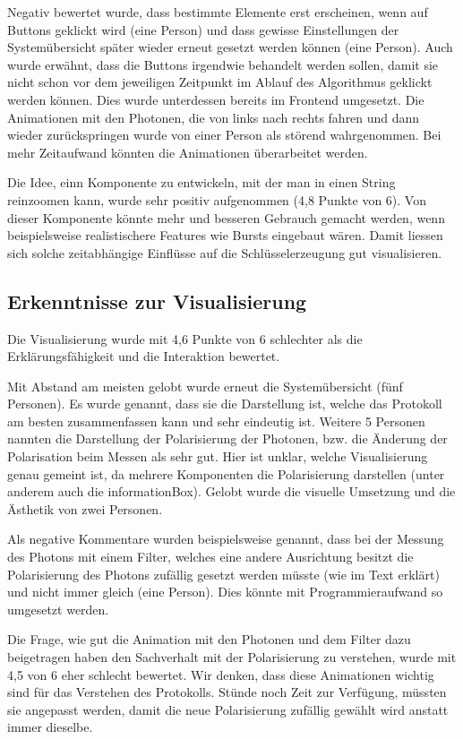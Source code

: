 \documentclass[a4paper,10.2pt,pdftex]{scrartcl}%
\begin{document}
Negativ bewertet wurde, dass bestimmte Elemente erst erscheinen, wenn auf Buttons geklickt wird (eine Person) und dass gewisse Einstellungen der Systemübersicht später wieder erneut gesetzt werden können (eine Person). Auch wurde erwähnt, dass die Buttons irgendwie behandelt werden sollen, damit sie nicht schon vor dem jeweiligen Zeitpunkt im Ablauf des Algorithmus geklickt werden können. Dies wurde unterdessen bereits im Frontend umgesetzt. Die Animationen mit den Photonen, die von links nach rechts fahren und dann wieder zurückspringen wurde von einer Person als störend wahrgenommen. Bei mehr Zeitaufwand könnten die Animationen überarbeitet werden.

Die Idee, einn Komponente zu entwickeln, mit der man in einen String reinzoomen kann, wurde sehr positiv aufgenommen (4,8 Punkte von 6). Von dieser Komponente könnte mehr und besseren Gebrauch gemacht werden, wenn beispielsweise realistischere Features wie Bursts eingebaut wären. Damit liessen sich solche zeitabhängige Einflüsse auf die Schlüsselerzeugung gut visualisieren.
\subsection{Erkenntnisse zur Visualisierung}
Die Visualisierung wurde mit 4,6 Punkte von 6 schlechter als die Erklärungsfähigkeit und die Interaktion bewertet.

Mit Abstand am meisten gelobt wurde erneut die Systemübersicht (fünf Personen). Es wurde genannt, dass sie die Darstellung ist, welche das Protokoll am besten zusammenfassen kann und sehr eindeutig ist. Weitere 5 Personen nannten die Darstellung der Polarisierung der Photonen, bzw. die Änderung der Polarisation beim Messen als sehr gut. Hier ist unklar, welche Visualisierung genau gemeint ist, da mehrere Komponenten die Polarisierung darstellen (unter anderem auch die informationBox). Gelobt wurde die visuelle Umsetzung und die Ästhetik von zwei Personen.

Als negative Kommentare wurden beispielsweise genannt, dass bei der Messung des Photons mit einem Filter, welches eine andere Ausrichtung besitzt die Polarisierung des Photons zufällig gesetzt werden müsste (wie im Text erklärt) und nicht immer gleich (eine Person). Dies könnte mit Programmieraufwand so umgesetzt werden.

Die Frage, wie gut die Animation mit den Photonen und dem Filter dazu beigetragen haben den Sachverhalt mit der Polarisierung zu verstehen, wurde mit 4,5 von 6 eher schlecht bewertet. Wir denken, dass diese Animationen wichtig sind für das Verstehen des Protokolls. Stünde noch Zeit zur Verfügung, müssten sie angepasst werden, damit die neue Polarisierung zufällig gewählt wird anstatt immer dieselbe.
\newpage
\end{document}
